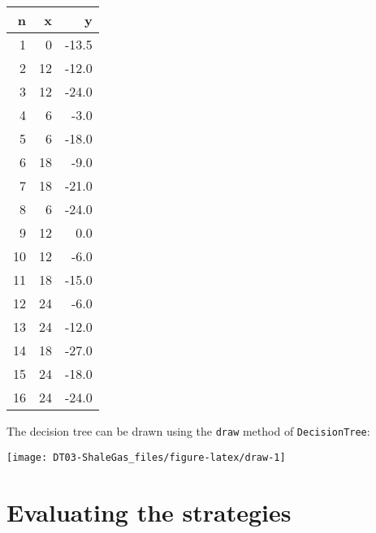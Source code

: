 \documentclass[
]{article}
\newenvironment{Shaded}{\begin{snugshade}}{\end{snugshade}}
\newcommand{\AttributeTok}[1]{\textcolor[rgb]{0.77,0.63,0.00}{#1}}
\newcommand{\CommentTok}[1]{\textcolor[rgb]{0.56,0.35,0.01}{\textit{#1}}}
\newcommand{\DecValTok}[1]{\textcolor[rgb]{0.00,0.00,0.81}{#1}}
\newcommand{\FunctionTok}[1]{\textcolor[rgb]{0.00,0.00,0.00}{#1}}
\newcommand{\NormalTok}[1]{#1}
\newcommand{\OtherTok}[1]{\textcolor[rgb]{0.56,0.35,0.01}{#1}}
\newcommand{\SpecialCharTok}[1]{\textcolor[rgb]{0.00,0.00,0.00}{#1}}
\newcommand{\StringTok}[1]{\textcolor[rgb]{0.31,0.60,0.02}{#1}}
\begin{document}
\begin{Shaded}
\end{Shaded}

\begin{longtable}[]{@{}rrr@{}}
\toprule
n & x & y\tabularnewline
\midrule
\endhead
1 & 0 & -13.5\tabularnewline
2 & 12 & -12.0\tabularnewline
3 & 12 & -24.0\tabularnewline
4 & 6 & -3.0\tabularnewline
5 & 6 & -18.0\tabularnewline
6 & 18 & -9.0\tabularnewline
7 & 18 & -21.0\tabularnewline
8 & 6 & -24.0\tabularnewline
9 & 12 & 0.0\tabularnewline
10 & 12 & -6.0\tabularnewline
11 & 18 & -15.0\tabularnewline
12 & 24 & -6.0\tabularnewline
13 & 24 & -12.0\tabularnewline
14 & 18 & -27.0\tabularnewline
15 & 24 & -18.0\tabularnewline
16 & 24 & -24.0\tabularnewline
\bottomrule
\end{longtable}

The decision tree can be drawn using the \texttt{draw} method of
\texttt{DecisionTree}:

\begin{center}\texttt{[image: DT03-ShaleGas\_files/figure-latex/draw-1]} \end{center}

\hypertarget{evaluating-the-strategies}{%
\section{Evaluating the strategies}\label{evaluating-the-strategies}}
\end{document}
